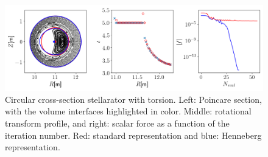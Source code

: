 \documentclass[my_thesis.tex]{subfiles}
\begin{document}
\begin{figure}
	\centering
	\includegraphics[width=\linewidth]{images/HennebergRepresentation/CircularTorsion.png}
	\caption{Circular cross-section stellarator with torsion. Left: Poincare section, with the volume interfaces highlighted in color. Middle: rotational transform profile, and right: scalar force as a function of the iteration number. Red: standard representation and blue: Henneberg representation.}
	\label{fig. circular stellarator henneberg represensation}
\end{figure}
\end{document}
